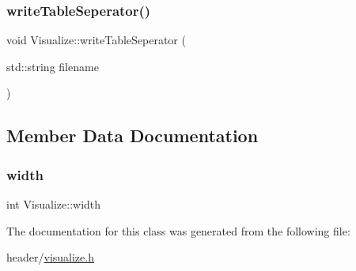 \subsubsection{\texorpdfstring{write\+Table\+Seperator()}{writeTableSeperator()}}
{\footnotesize\ttfamily void Visualize\+::write\+Table\+Seperator (\begin{DoxyParamCaption}\item[{std\+::string}]{filename }\end{DoxyParamCaption})}



\subsection{Member Data Documentation}
\mbox{\label{class_visualize_af5ac723ad5f8fe8c4a8378bf1299cda7}} 
\subsubsection{\texorpdfstring{width}{width}}
{\footnotesize\ttfamily int Visualize\+::width}



The documentation for this class was generated from the following file\+:\begin{DoxyCompactItemize}
\item 
header/\hyperlink{visualize_8h}{visualize.\+h}\end{DoxyCompactItemize}
